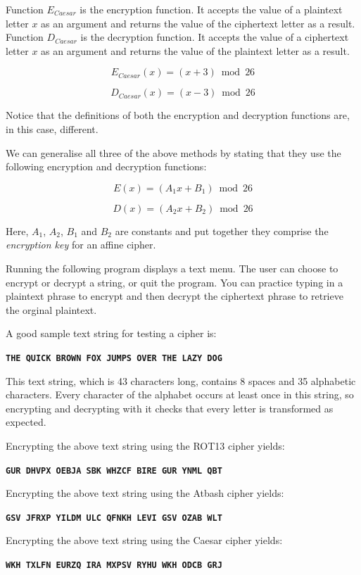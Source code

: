 Function $E_{Caesar}$ is the encryption function. It accepts the value of a plaintext letter $x$ as an argument and returns the value of the ciphertext letter as a result. Function $D_{Caesar}$ is the decryption function. It accepts the value of a ciphertext letter $x$ as an argument and returns the value of the plaintext letter as a result. 

\[
  E_{Caesar}(x) = (x + 3) \bmod 26
\]

\[
  D_{Caesar}(x) = (x - 3) \bmod 26
\]

Notice that the definitions of both the encryption and decryption functions are, in this case, different. 

We can generalise all three of the above methods by stating that they use the following encryption and decryption functions:

\[
 E(x) = (A_{1}x + B_{1}) \bmod 26
\]

\[
 D(x) = (A_{2}x + B_{2}) \bmod 26
\] 

Here, $A_{1}$, $A_{2}$, $B_{1}$ and $B_{2}$ are constants and put together they comprise the {\it encryption key} for an affine cipher.

Running the following program displays a text menu. The user can choose to encrypt or decrypt a string, or quit the program. You can practice typing in a plaintext phrase to encrypt and then decrypt the ciphertext phrase to retrieve the orginal plaintext. 

A good sample text string for testing a cipher is:

\texttt{\bf THE QUICK BROWN FOX JUMPS OVER THE LAZY DOG}

This text string, which is 43 characters long, contains 8 spaces and 35 alphabetic characters. Every character of the alphabet occurs at least once in this string, so encrypting and decrypting with it checks that every letter is transformed as expected.

Encrypting the above text string using the ROT13 cipher yields:

\texttt{\bf GUR DHVPX OEBJA SBK WHZCF BIRE GUR YNML QBT}

Encrypting the above text string using the Atbash cipher yields:

\texttt{\bf GSV JFRXP YILDM ULC QFNKH LEVI GSV OZAB WLT}

Encrypting the above text string using the Caesar cipher yields:

\texttt{\bf WKH TXLFN EURZQ IRA MXPSV RYHU WKH ODCB GRJ}

